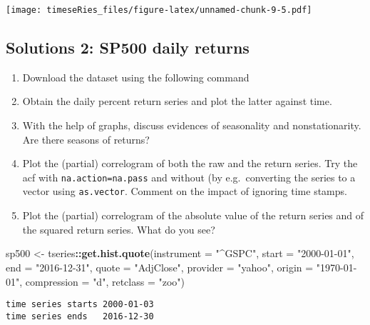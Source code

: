 \documentclass[]{book}
\newenvironment{Shaded}{\begin{snugshade}}{\end{snugshade}}
\newcommand{\KeywordTok}[1]{\textcolor[rgb]{0.13,0.29,0.53}{\textbf{#1}}}
\newcommand{\DataTypeTok}[1]{\textcolor[rgb]{0.13,0.29,0.53}{#1}}
\newcommand{\StringTok}[1]{\textcolor[rgb]{0.31,0.60,0.02}{#1}}
\newcommand{\OperatorTok}[1]{\textcolor[rgb]{0.81,0.36,0.00}{\textbf{#1}}}
\newcommand{\NormalTok}[1]{#1}
\providecommand{\tightlist}{%
  \setlength{\itemsep}{0pt}\setlength{\parskip}{0pt}}
\begin{document}
\texttt{[image: timeseRies\_files/figure-latex/unnamed-chunk-9-5.pdf]}

\subsection{Solutions 2: SP500 daily
returns}\label{solutions-2-sp500-daily-returns}

\begin{enumerate}
\def\labelenumi{\arabic{enumi}.}
\tightlist
\item
  Download the dataset using the following command
\item
  Obtain the daily percent return series and plot the latter against
  time.
\item
  With the help of graphs, discuss evidences of seasonality and
  nonstationarity. Are there seasons of returns?
\item
  Plot the (partial) correlogram of both the raw and the return series.
  Try the acf with \texttt{na.action=na.pass} and without (by
  e.g.~converting the series to a vector using \texttt{as.vector}.
  Comment on the impact of ignoring time stamps.
\item
  Plot the (partial) correlogram of the absolute value of the return
  series and of the squared return series. What do you see?
\end{enumerate}

\begin{Shaded}
\begin{Highlighting}[]
\NormalTok{sp500 <-}\StringTok{ }\NormalTok{tseries}\OperatorTok{::}\KeywordTok{get.hist.quote}\NormalTok{(}\DataTypeTok{instrument =} \StringTok{"^GSPC"}\NormalTok{, }\DataTypeTok{start =} \StringTok{"2000-01-01"}\NormalTok{, }
    \DataTypeTok{end =} \StringTok{"2016-12-31"}\NormalTok{, }\DataTypeTok{quote =} \StringTok{"AdjClose"}\NormalTok{, }\DataTypeTok{provider =} \StringTok{"yahoo"}\NormalTok{, }\DataTypeTok{origin =} \StringTok{"1970-01-01"}\NormalTok{, }
    \DataTypeTok{compression =} \StringTok{"d"}\NormalTok{, }\DataTypeTok{retclass =} \StringTok{"zoo"}\NormalTok{)}
\end{Highlighting}
\end{Shaded}

\begin{verbatim}
time series starts 2000-01-03
time series ends   2016-12-30
\end{verbatim}
\end{document}
